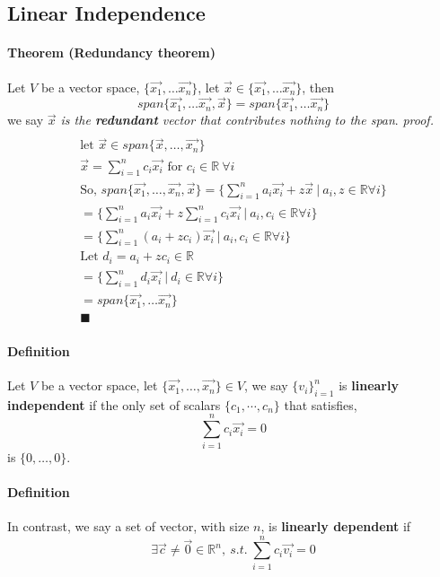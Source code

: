 \documentclass[11pt]{article}
\begin{document}
	\subsection{Linear Independence}
	\paragraph{Theorem (Redundancy theorem)} Let $V$ be a vector space, $\{\vec{x_1},\dots\vec{x_n}\}$, let $\vec{x} \in \{\vec{x_1},\dots\vec{x_n}\}$, then
	\[
	span\{\vec{x_1},\dots\vec{x_n},\vec{x}\} = span\{\vec{x_1},\dots\vec{x_n}\}
	\]
	we say \emph{$\vec{x}$ is the \textbf{redundant} vector that contributes nothing to the span}.
	\newline
	\emph{proof.}
	\begin{multline*}
		\\
		\text{let } \vec{x} \in span\{\vec{x}, \dots, \vec{x_n}\}\\
		\vec{x} = \sum_{i=1}^n{c_i \vec{x_i}} \text{ for }c_i \in \mathbb{R}\ \forall i\\
		\text{So, } span\{\vec{x_1},\dots,\vec{x_n},\vec{x}\} = \{\sum_{i=1}^n{a_i \vec{x_i}} + z \vec{x}\ \vert\ a_i,z \in \mathbb{R} \forall i\} \\
		= \{\sum_{i=1}^n{a_i \vec{x_i}} + z\sum_{i=1}^n{c_i \vec{x_i}}\ \vert\ a_i,c_i \in \mathbb{R} \forall i\} \\
		= \{\sum_{i=1}^n{(a_i + zc_i) \vec{x_i}}\ \vert\ a_i,c_i \in \mathbb{R} \forall i\} \\
		\text{Let } d_i = a_i + zc_i \in \mathbb{R} \\
		= \{\sum_{i=1}^n{d_i \vec{x_i}}\ \vert\ d_i \in \mathbb{R} \forall i\} \\
		= span\{\vec{x_1},\dots\vec{x_n}\} \\
		\blacksquare
	\end{multline*}
	
	\paragraph{Definition} Let $V$ be a vector space, let $\{\vec{x_1},\dots,\vec{x_n}\} \in V$, we say $\{v_i\}_{i=1}^n$ is \textbf{linearly independent} if the only set of scalars $\{c_1,\cdots, c_n \} $ that satisfies,
		\[
			\sum_{i=1}^n{c_i \vec{x_i}} = 0
		\]
		is $\{0,\dots,0\}$.
		
	\paragraph{Definition} In contrast, we say a set of vector, with size $n$, is \textbf{linearly dependent} if 
	\[
	\exists \vec{c} \neq \vec{0} \in \mathbb{R}^n,\ s.t.\ \sum_{i=1}^n{c_i\vec{v_i}} = 0
	\]
\end{document}
